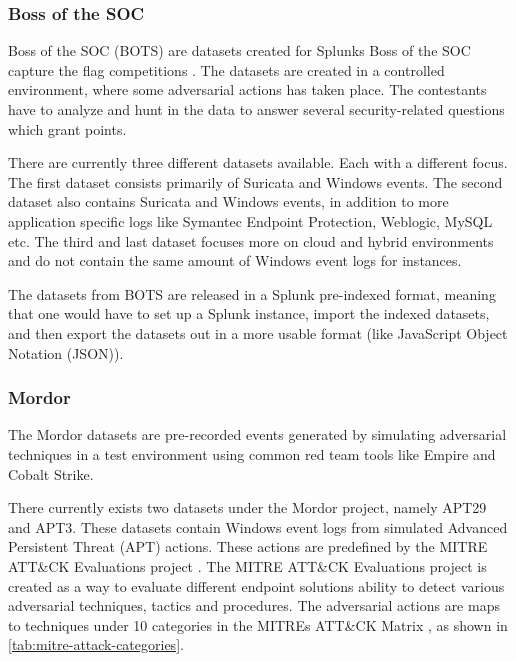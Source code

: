 \subsubsection{Boss of the SOC}
Boss of the SOC (BOTS) are datasets created for Splunks Boss of the SOC capture the flag competitions \cite{bossofthesocdatasets}. The datasets are created in a controlled environment, where some adversarial actions has taken place. The contestants have to analyze and hunt in the data to answer several security-related questions which grant points.

There are currently three different datasets available. Each with a different focus. The first dataset consists primarily of Suricata \cite{Suricata49:online} and Windows events. The second dataset also contains Suricata and Windows events, in addition to more application specific logs like Symantec Endpoint Protection, Weblogic, MySQL etc. The third and last dataset focuses more on cloud and hybrid environments and do not contain the same amount of Windows event logs for instances.

The datasets from BOTS are released in a Splunk pre-indexed format, meaning that one would have to set up a Splunk instance, import the indexed datasets, and then export the datasets out in a more usable format (like JavaScript Object Notation (JSON)). 

\subsubsection{Mordor}
The Mordor datasets \cite{mordor_datasets} are pre-recorded events generated by simulating adversarial techniques in a test environment using common red team tools like Empire and Cobalt Strike.

There currently exists two datasets under the Mordor project, namely APT29 and APT3. These datasets contain Windows event logs from simulated Advanced Persistent Threat (APT) actions. These actions are predefined by the MITRE ATT\&CK Evaluations project \cite{MITREevals}. The MITRE ATT\&CK Evaluations project is created as a way to evaluate different endpoint solutions ability to detect various adversarial techniques, tactics and procedures. The adversarial actions are maps to techniques under 10 categories in the MITREs ATT\&CK Matrix \cite{MITREmatrix}, as shown in \cref{tab:mitre-attack-categories}.

